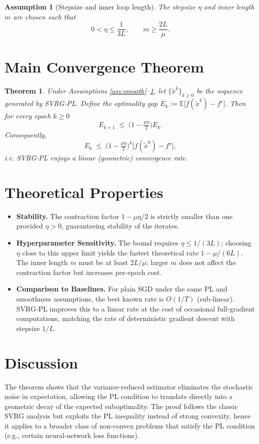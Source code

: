 \documentclass{article}
\newtheorem{theorem}{Theorem}
\newtheorem{assumption}{Assumption}
\begin{document}
\begin{assumption}[Stepsize and inner loop length]\label{ass:params}
The stepsize $\eta$ and inner length $m$ are chosen such that
\[
0<\eta\le \frac{1}{3L},\qquad 
m\ge \frac{2L}{\mu}.
\]
\end{assumption}

\section*{Main Convergence Theorem}
\begin{theorem}\label{thm:linear}
Under Assumptions \ref{ass:smooth}–\ref{ass:params},
let $\{\tilde{x}^{k}\}_{k\ge0}$ be the sequence generated by SVRG‑PL.
Define the optimality gap $E_{k}:=\mathbb{E}\big[f(\tilde{x}^{k})-f^{\star}\big]$.
Then for every epoch $k\ge0$
\[
E_{k+1}\;\le\;\bigl(1-\tfrac{\mu\eta}{2}\bigr)E_{k}.
\]
Consequently,
\[
E_{k}\;\le\;\bigl(1-\tfrac{\mu\eta}{2}\bigr)^{k}\bigl[f(\tilde{x}^{0})-f^{\star}\bigr],
\]
i.e. SVRG‑PL enjoys a linear (geometric) convergence rate.
\end{theorem}

\section*{Theoretical Properties}
\begin{itemize}
\item \textbf{Stability.} The contraction factor $1-\mu\eta/2$ is strictly smaller than one
provided $\eta>0$, guaranteeing stability of the iterates.
\item \textbf{Hyperparameter Sensitivity.}
The bound requires $\eta\le 1/(3L)$; choosing $\eta$ close to this upper limit yields the fastest
theoretical rate $1-\mu/(6L)$. The inner length $m$ must be at least $2L/\mu$;
larger $m$ does not affect the contraction factor but increases per‑epoch cost.
\item \textbf{Comparison to Baselines.}
For plain SGD under the same PL and smoothness assumptions, the best known rate is
$O(1/T)$ (sub‑linear). SVRG‑PL improves this to a linear rate at the cost of occasional full‑gradient
computations, matching the rate of deterministic gradient descent with stepsize $1/L$.
\end{itemize}

\section*{Discussion}
The theorem shows that the variance‑reduced estimator eliminates the stochastic noise
in expectation, allowing the PL condition to translate directly into a geometric decay of the
expected suboptimality. The proof follows the classic SVRG analysis but
exploits the PL inequality instead of strong convexity, hence it applies to a broader
class of non‑convex problems that satisfy the PL condition (e.g., certain neural‑network loss
functions).
\end{document}
